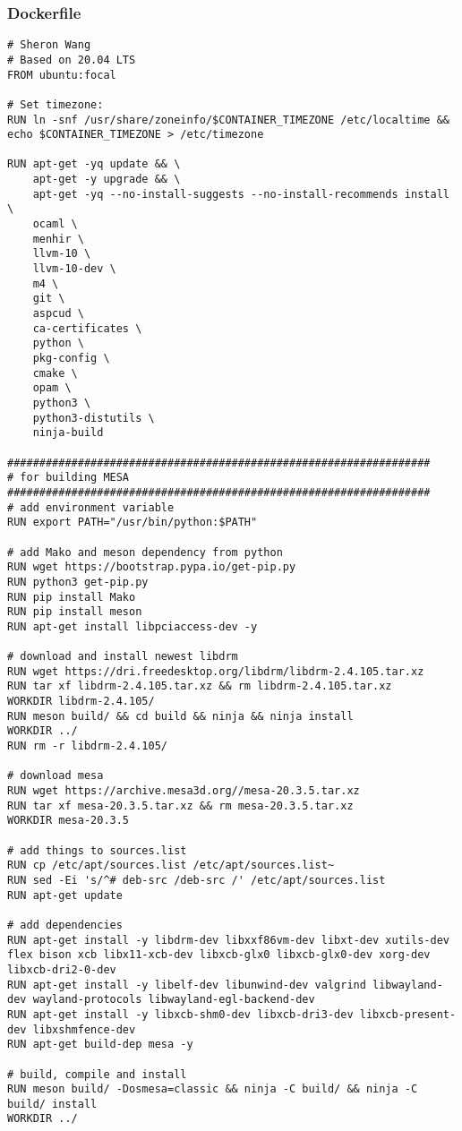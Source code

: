\documentclass[main.tex]{subfiles}
\begin{document}
\subsubsection{Dockerfile}
\begin{lstlisting}
# Sheron Wang
# Based on 20.04 LTS
FROM ubuntu:focal

# Set timezone:
RUN ln -snf /usr/share/zoneinfo/$CONTAINER_TIMEZONE /etc/localtime && echo $CONTAINER_TIMEZONE > /etc/timezone

RUN apt-get -yq update && \
    apt-get -y upgrade && \
    apt-get -yq --no-install-suggests --no-install-recommends install \
    ocaml \
    menhir \
    llvm-10 \
    llvm-10-dev \
    m4 \
    git \
    aspcud \
    ca-certificates \
    python \
    pkg-config \
    cmake \
    opam \
    python3 \
    python3-distutils \
    ninja-build

##################################################################
# for building MESA
##################################################################
# add environment variable
RUN export PATH="/usr/bin/python:$PATH"

# add Mako and meson dependency from python
RUN wget https://bootstrap.pypa.io/get-pip.py
RUN python3 get-pip.py
RUN pip install Mako
RUN pip install meson
RUN apt-get install libpciaccess-dev -y

# download and install newest libdrm
RUN wget https://dri.freedesktop.org/libdrm/libdrm-2.4.105.tar.xz
RUN tar xf libdrm-2.4.105.tar.xz && rm libdrm-2.4.105.tar.xz
WORKDIR libdrm-2.4.105/
RUN meson build/ && cd build && ninja && ninja install
WORKDIR ../
RUN rm -r libdrm-2.4.105/

# download mesa
RUN wget https://archive.mesa3d.org//mesa-20.3.5.tar.xz
RUN tar xf mesa-20.3.5.tar.xz && rm mesa-20.3.5.tar.xz
WORKDIR mesa-20.3.5

# add things to sources.list
RUN cp /etc/apt/sources.list /etc/apt/sources.list~
RUN sed -Ei 's/^# deb-src /deb-src /' /etc/apt/sources.list
RUN apt-get update

# add dependencies
RUN apt-get install -y libdrm-dev libxxf86vm-dev libxt-dev xutils-dev flex bison xcb libx11-xcb-dev libxcb-glx0 libxcb-glx0-dev xorg-dev libxcb-dri2-0-dev
RUN apt-get install -y libelf-dev libunwind-dev valgrind libwayland-dev wayland-protocols libwayland-egl-backend-dev
RUN apt-get install -y libxcb-shm0-dev libxcb-dri3-dev libxcb-present-dev libxshmfence-dev
RUN apt-get build-dep mesa -y

# build, compile and install
RUN meson build/ -Dosmesa=classic && ninja -C build/ && ninja -C build/ install
WORKDIR ../


\end{lstlisting}
\end{document}
